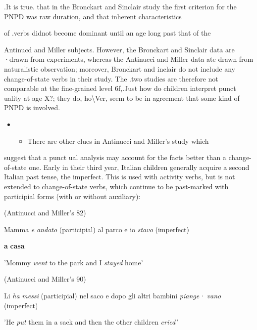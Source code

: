 .It is true. that in the Bronckart and Sinclair study the first cri\-terion for the PNPD was raw duration, and that inherent characteristics

of .verbs didnot become dominant until an age long past that of the

Antinucd and Miller subjects. However, the Bronckart and Sinclair data are ·drawn from experiments, whereas the Antinucci and Miller data ate drawn from naturalistic observation; moreover, Bronckart and inclair do not include any change-of-state verbs in their study. The .two studies are therefore not comparable at the fine-grained level 6f,.{\textquotedbl}Just how do children interpret punct uality at age X?{\textquotedbl}; they do, ho{\textbackslash}Ver, seem to be in agreement that some kind of PNPD is involved.

\begin{itemize}
\item \begin{itemize}
\item There are other clues in Antinucci and Miller's study which
\end{itemize}
\end{itemize}

  


 


suggest that a punct ual analysis may account for the facts better than a change-of-state one. Early in their third year, Italian children gener\-ally acquire a second Italian past tense, the imperfect. This is used with activity verbs, but is not extended to change-of-state verbs, which continue to be past-marked with participial forms (with or without auxiliary):

\ea\label{ex:22}
 (Antinucci and Miller's 82)
\glt
\z

Mamma \textit{e} \textit{andato} (participial) al parco e io \textit{stavo} (imperfect)

\textbf{a} \textbf{casa}

'Mommy \textit{went} to the park and I \textit{stayed} home'

\ea\label{ex:23}
 (Antinucci and Miller's 90)
\glt
\z

Li \textit{ha} \textit{messi }(participial) nel saco e dopo gli altri bambini \textit{piange·} \textit{vano }(imperfect)

'He \textit{put} them in a sack and then the other children \textit{cried'}

